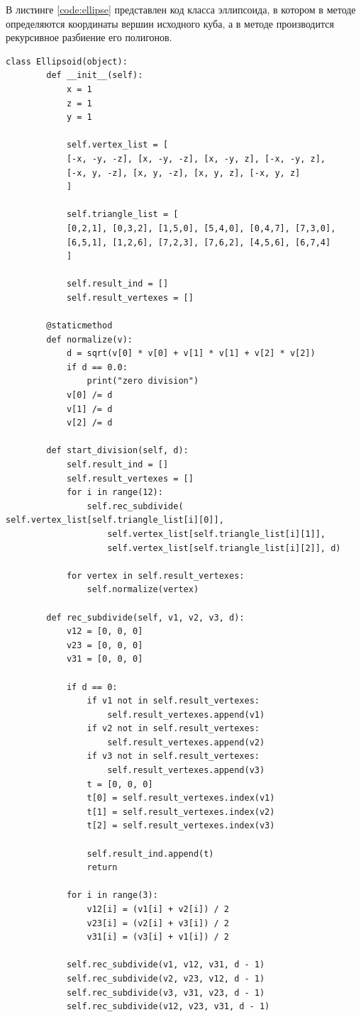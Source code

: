 В листинге \ref{code:ellipse} представлен код класса эллипсоида, в котором в методе  определяются координаты вершин исходного куба, а в методе  производится рекурсивное разбиение его полигонов.
\begin{lstlisting}[caption= Класс эллипсоида, label=code:ellipse]
	class Ellipsoid(object):
		def __init__(self):
			x = 1
			z = 1
			y = 1
			
			self.vertex_list = [
			[-x, -y, -z], [x, -y, -z], [x, -y, z], [-x, -y, z],
			[-x, y, -z], [x, y, -z], [x, y, z], [-x, y, z]
			]
			
			self.triangle_list = [
			[0,2,1], [0,3,2], [1,5,0], [5,4,0], [0,4,7], [7,3,0],
			[6,5,1], [1,2,6], [7,2,3], [7,6,2], [4,5,6], [6,7,4]
			]
			
			self.result_ind = []
			self.result_vertexes = []
		
		@staticmethod
		def normalize(v):
			d = sqrt(v[0] * v[0] + v[1] * v[1] + v[2] * v[2])
			if d == 0.0:
				print("zero division")
			v[0] /= d
			v[1] /= d
			v[2] /= d
		
		def start_division(self, d):
			self.result_ind = []
			self.result_vertexes = []
			for i in range(12):
				self.rec_subdivide( self.vertex_list[self.triangle_list[i][0]],
					self.vertex_list[self.triangle_list[i][1]],
					self.vertex_list[self.triangle_list[i][2]], d)
			
			for vertex in self.result_vertexes:
				self.normalize(vertex)
		
		def rec_subdivide(self, v1, v2, v3, d):
			v12 = [0, 0, 0]
			v23 = [0, 0, 0]
			v31 = [0, 0, 0]
			
			if d == 0:
				if v1 not in self.result_vertexes:
					self.result_vertexes.append(v1)
				if v2 not in self.result_vertexes:
					self.result_vertexes.append(v2)
				if v3 not in self.result_vertexes:
					self.result_vertexes.append(v3)
				t = [0, 0, 0]
				t[0] = self.result_vertexes.index(v1)
				t[1] = self.result_vertexes.index(v2)
				t[2] = self.result_vertexes.index(v3)
				
				self.result_ind.append(t)
				return
		
			for i in range(3):
				v12[i] = (v1[i] + v2[i]) / 2
				v23[i] = (v2[i] + v3[i]) / 2
				v31[i] = (v3[i] + v1[i]) / 2
			
			self.rec_subdivide(v1, v12, v31, d - 1)
			self.rec_subdivide(v2, v23, v12, d - 1)
			self.rec_subdivide(v3, v31, v23, d - 1)
			self.rec_subdivide(v12, v23, v31, d - 1)
		

\end{lstlisting}
